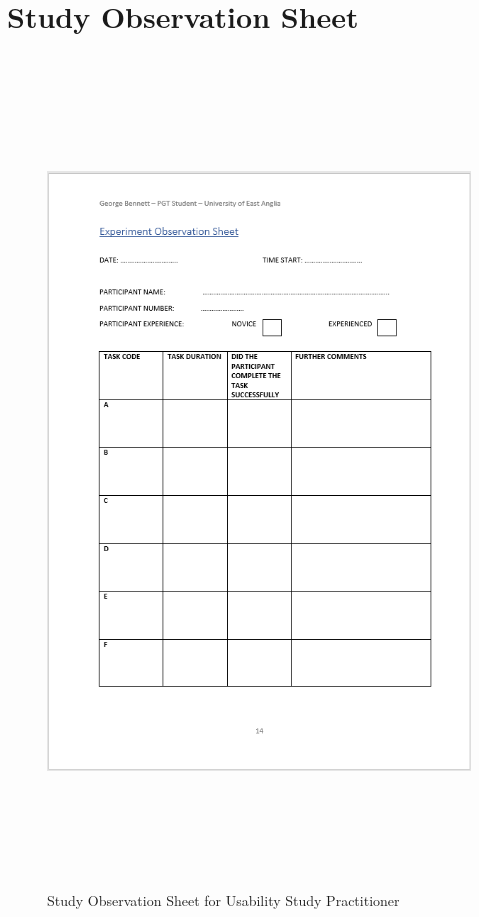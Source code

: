\section{Study Observation Sheet}
\begin{figure}[H]
\includegraphics[width=16cm,height=22cm]{Screenshots/StudyMaterialScreenshots/observationSheet.png}
\caption{Study Observation Sheet for Usability Study Practitioner}
\end{figure}

